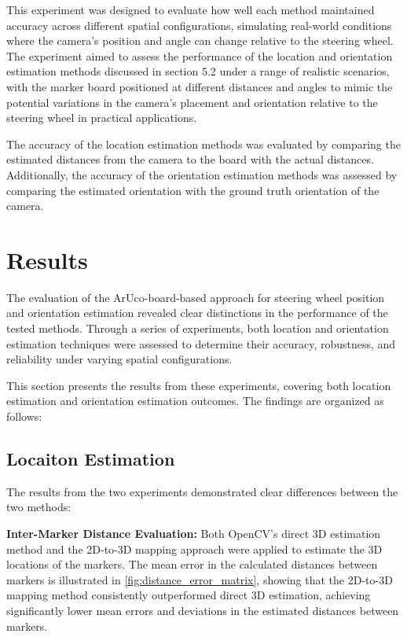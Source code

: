 This experiment was designed to evaluate how well each method maintained accuracy across different spatial configurations, simulating real-world conditions where the camera's position and angle can change relative to the steering wheel. The experiment aimed to assess the performance of the location and orientation estimation methods discussed in section 5.2 under a range of realistic scenarios, with the marker board positioned at different distances and angles to mimic the potential variations in the camera's placement and orientation relative to the steering wheel in practical applications.

The accuracy of the location estimation methods was evaluated by comparing the estimated distances from the camera to the board with the actual distances. Additionally, the accuracy of the orientation estimation methods was assessed by comparing the estimated orientation with the ground truth orientation of the camera.

\section{Results}
The evaluation of the ArUco-board-based approach for steering wheel position and orientation estimation revealed clear distinctions in the performance of the tested methods. Through a series of experiments, both location and orientation estimation techniques were assessed to determine their accuracy, robustness, and reliability under varying spatial configurations.

This section presents the results from these experiments, covering both location estimation and orientation estimation outcomes. The findings are organized as follows:

\subsection{Locaiton Estimation}
The results from the two experiments demonstrated clear differences between the two methods:

\textbf{Inter-Marker Distance Evaluation:}
Both OpenCV’s direct 3D estimation method and the 2D-to-3D mapping approach were applied to estimate the 3D locations of the markers. The mean error in the calculated distances between markers is illustrated in \cref{fig:distance_error_matrix}, showing that the 2D-to-3D mapping method consistently outperformed direct 3D estimation, achieving significantly lower mean errors and deviations in the estimated distances between markers.

